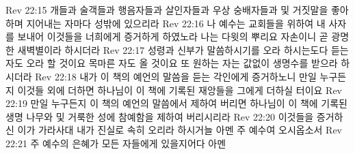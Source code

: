 Rev 22:15  개들과 술객들과 행음자들과 살인자들과 우상 숭배자들과 및 거짓말을 좋아하며 지어내는 자마다 성밖에 있으리라
Rev 22:16  나 예수는 교회들을 위하여 내 사자를 보내어 이것들을 너희에게 증거하게 하였노라 나는 다윗의 뿌리요 자손이니 곧 광명한 새벽별이라 하시더라
Rev 22:17  성령과 신부가 말씀하시기를 오라 하시는도다 듣는 자도 오라 할 것이요 목마른 자도 올 것이요 또 원하는 자는 값없이 생명수를 받으라 하시더라
Rev 22:18  내가 이 책의 예언의 말씀을 듣는 각인에게 증거하노니 만일 누구든지 이것들 외에 더하면 하나님이 이 책에 기록된 재앙들을 그에게 더하실 터이요
Rev 22:19  만일 누구든지 이 책의 예언의 말씀에서 제하여 버리면 하나님이 이 책에 기록된 생명 나무와 및 거룩한 성에 참예함을 제하여 버리시리라
Rev 22:20  이것들을 증거하신 이가 가라사대 내가 진실로 속히 오리라 하시거늘 아멘 주 예수여 오시옵소서
Rev 22:21  주 예수의 은혜가 모든 자들에게 있을지어다 아멘


